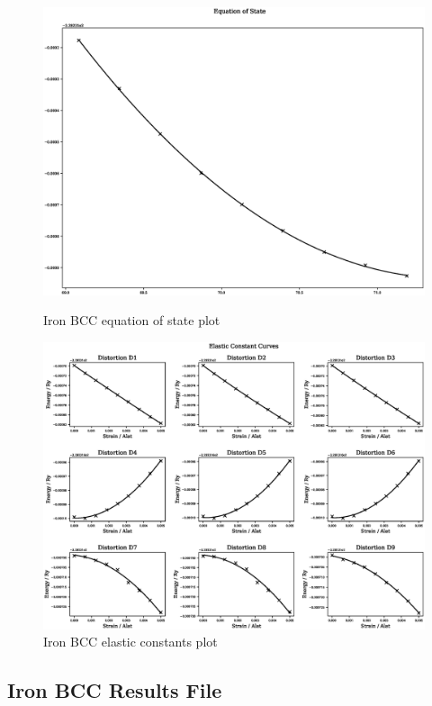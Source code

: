 \FloatBarrier
\begin{figure}[!htb]
\includegraphics[width=\linewidth]{appendix/dft_property_calculations/bccfenomag/eos.eps}
\caption{Iron BCC equation of state plot}
\label{fig:feeosplot1}
\endminipage\hfill
{}
\includegraphics[width=\linewidth]{appendix/dft_property_calculations/bccfenomag/ec.eps}
\caption{Iron BCC elastic constants plot}
\label{fig:feecplot1}
\endminipage
\end{figure}
\FloatBarrier

\clearpage
\FloatBarrier
\subsection{Iron BCC Results File}

